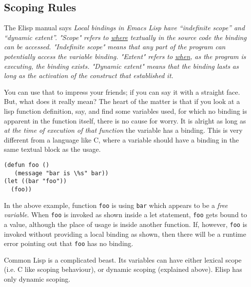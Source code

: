 \documentclass[10pt]{article}
\begin{document}

\subsection{Scoping Rules}

The Elisp manual says \textit{Local bindings in Emacs Lisp have ``indefinite
  scope'' and ``dynamic extent''.  "Scope" refers to \underline{where}
  textually in the source code the binding can be accessed.  "Indefinite scope"
  means that any part of the program can potentially access the variable
  binding.  "Extent" refers to \underline{when}, as the program is executing,
  the binding exists.  "Dynamic extent" means that the binding lasts as long as
  the activation of the construct that established it.}

You can use that to impress your friends; if you can say it with a straight
face.  But, what does it really mean?  The heart of the matter is that if you
look at a lisp function definition, say, and find some variables used, for
which no binding is apparent in the function itself, there is no cause for
worry.  It is alright as long as \textit{at the time of execution of that
  function} the variable has a binding.  This is very different from a
language like C, where a variable should have a binding in the same textual
block as the usage.

\begin{verbatim}
(defun foo ()
   (message "bar is \%s" bar))
(let ((bar "foo"))
  (foo))
\end{verbatim}

In the above example, function \texttt{foo} is using \texttt{bar} which appears
to be a \textit{free variable}.  When \texttt{foo} is invoked as shown inside a
let statement, \texttt{foo} gets bound to a value, although the place of usage
is inside another function.  If, however, \texttt{foo} is invoked without
providing a local binding as shown, then there will be a runtime error pointing
out that \texttt{foo} has no binding.

Common Lisp is a complicated beast.  Its variables can have either lexical
scope (i.e. C like scoping behaviour), or dynamic scoping (explained above).
Elisp has only dynamic scoping.
\end{document}
